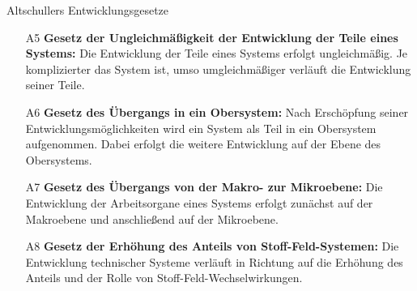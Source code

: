 \documentclass{beamer}
\begin{document}
\begin{frame}{Altschullers Entwicklungsgesetze}
  \small
\begin{enumerate}
\item[A5] \textbf{Gesetz der Ungleichmäßigkeit der Entwicklung der Teile eines
  Systems:} Die Entwicklung der Teile eines Systems erfolgt ungleichmäßig. Je
  komplizierter das System ist, umso umgleichmäßiger verläuft die Entwicklung
  seiner Teile.
\item[A6] \textbf{Gesetz des Übergangs in ein Obersystem:} Nach Erschöpfung
  seiner Entwicklungsmöglichkeiten wird ein System als Teil in ein Obersystem
  aufgenommen. Dabei erfolgt die weitere Entwicklung auf der Ebene des
  Obersystems.
\item[A7] \textbf{Gesetz des Übergangs von der Makro- zur Mikroebene:} Die
  Entwicklung der Arbeitsorgane eines Systems erfolgt zunächst auf der
  Makroebene und anschließend auf der Mikroebene.
\item[A8] \textbf{Gesetz der Erhöhung des Anteils von Stoff-Feld-Systemen:}
  Die Entwicklung technischer Systeme verläuft in Richtung auf die Erhöhung
  des Anteils und der Rolle von Stoff-Feld-Wechselwirkungen.
\end{enumerate}
\end{frame}

\end{document}
